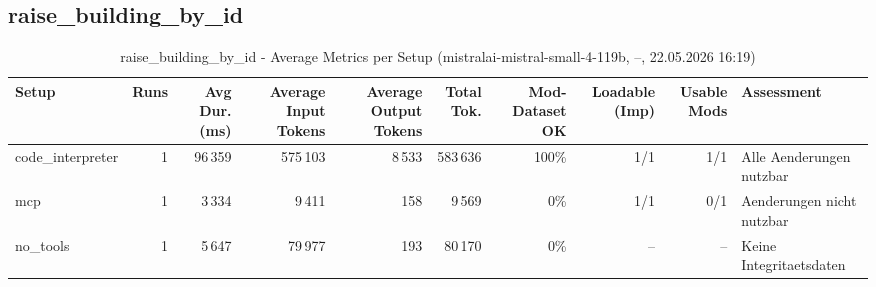 \documentclass[a4paper,11pt]{article}
\begin{document}
\clearpage

\subsection{raise\_building\_by\_id}

\begin{table}[H]
\centering
\scriptsize
\caption{raise\_building\_by\_id - Average Metrics per Setup (mistralai-mistral-small-4-119b, --, 22.05.2026 16:19)}
\label{tab:combined\_raise\_building\_by\_id\_metrics\_20260522}
\begin{tabular}{l r r r r r r r r l}
\toprule
Setup & Runs & Avg Dur. (ms) & Average Input Tokens & Average Output Tokens & Total Tok. & Mod-Dataset OK & Loadable (Imp) & Usable Mods & Assessment \\
\midrule
code\_interpreter & 1 & 96\,359 & 575\,103 & 8\,533 & 583\,636 & 100\% & 1/1 & 1/1 & Alle Aenderungen nutzbar \\
mcp & 1 & 3\,334 & 9\,411 & 158 & 9\,569 & 0\% & 1/1 & 0/1 & Aenderungen nicht nutzbar \\
no\_tools & 1 & 5\,647 & 79\,977 & 193 & 80\,170 & 0\% & -- & -- & Keine Integritaetsdaten \\
\bottomrule
\end{tabular}
\end{table}

\begin{table}[H]
\centering
\scriptsize
\caption{raise\_building\_by\_id - Detailed Runs Comparison (mistralai-mistral-small-4-119b, --, 22.05.2026 16:19)}
\end{table}
\end{document}
